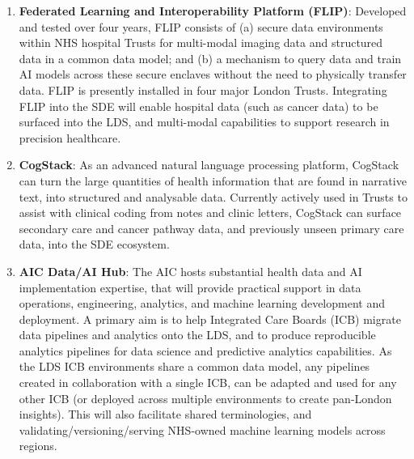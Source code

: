 \documentclass[
  letterpaper,
  DIV=11,
  numbers=noendperiod]{scrartcl}
\begin{document}
\begin{enumerate}
\def\labelenumi{(\arabic{enumi})}
\item
  \textbf{Federated Learning and Interoperability Platform (FLIP)}:
  Developed and tested over four years, FLIP consists of (a) secure data
  environments within NHS hospital Trusts for multi-modal imaging data
  and structured data in a common data model; and (b) a mechanism to
  query data and train AI models across these secure enclaves without
  the need to physically transfer data. FLIP is presently installed in
  four major London Trusts. Integrating FLIP into the SDE will enable
  hospital data (such as cancer data) to be surfaced into the LDS, and
  multi-modal capabilities to support research in precision healthcare.
\item
  \textbf{CogStack}: As an advanced natural language processing
  platform, CogStack can turn the large quantities of health information
  that are found in narrative text, into structured and analysable data.
  Currently actively used in Trusts to assist with clinical coding from
  notes and clinic letters, CogStack can surface secondary care and
  cancer pathway data, and previously unseen primary care data, into the
  SDE ecosystem.
\item
  \textbf{AIC Data/AI Hub}: The AIC hosts substantial health data and AI
  implementation expertise, that will provide practical support in data
  operations, engineering, analytics, and machine learning development
  and deployment. A primary aim is to help Integrated Care Boards (ICB)
  migrate data pipelines and analytics onto the LDS, and to produce
  reproducible analytics pipelines for data science and predictive
  analytics capabilities. As the LDS ICB environments share a common
  data model, any pipelines created in collaboration with a single ICB,
  can be adapted and used for any other ICB (or deployed across multiple
  environments to create pan-London insights). This will also facilitate
  shared terminologies, and validating/versioning/serving NHS-owned
  machine learning models across regions.
\end{enumerate}
\end{document}
